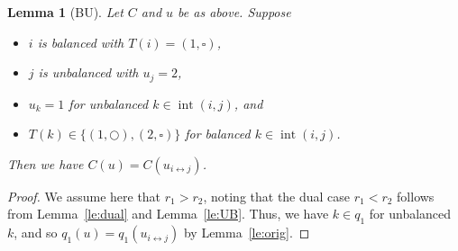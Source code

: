 \documentclass[reqno]{amsart}
\newcommand{\0}{\phantom{c}}
\DeclareMathOperator{\inter}{int} %
\theoremstyle{plain}
\newtheorem{lemma}[thm]{Lemma}
\theoremstyle{definition}
\numberwithin{equation}{section}
\begin{document}

\begin{lemma}[BU]
\label{le:BU}
  Let $C$ and $u$ be as above.
  Suppose
  \begin{itemize}
    \item $i$ is balanced with $T(i) = (1,\square)$,
    \item $j$ is unbalanced with $u_j = 2$,
    \item $u_k = 1$ for unbalanced $k \in \inter (i,j)$, and
    \item $T(k) \in \{(1,\bigcirc),(2,\square)\}$ for balanced $k \in \inter(i,j)$.
  \end{itemize}
  Then we have $C(u) = C(u_{i \leftrightarrow j})$.
 \end{lemma} 
 
\begin{proof}
  We assume here that $r_1 > r_2$, noting that the dual case $r_1 < r_2$ follows from Lemma~\ref{le:dual} and Lemma~\ref{le:UB}.
  Thus, we have $k \in q_1$ for unbalanced $k$, and so $q_1(u) = q_1(u_{i\leftrightarrow j})$ by Lemma~\ref{le:orig}.
\end{proof}
\end{document}
